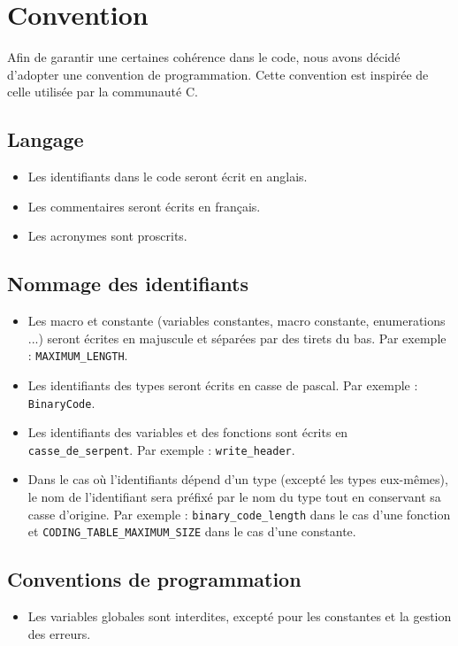 \section{Convention}

Afin de garantir une certaines cohérence dans le code, nous avons décidé d'adopter une convention de programmation.
Cette convention est inspirée de celle utilisée par la communauté C.

\subsection{Langage}

\begin{itemize}
    \item Les identifiants dans le code seront écrit en anglais.
    \item Les commentaires seront écrits en français.
    \item Les acronymes sont proscrits.
\end{itemize}

\subsection{Nommage des identifiants}

\begin{itemize}
    \item Les macro et constante (variables constantes, macro constante, enumerations ...) seront écrites en majuscule et séparées par des tirets du bas. Par exemple : \texttt{MAXIMUM\_LENGTH}.
    \item Les identifiants des types seront écrits en casse de pascal. Par exemple : \texttt{BinaryCode}.
    \item Les identifiants des variables et des fonctions sont écrits en \texttt{casse\_de\_serpent}. Par exemple : \texttt{write\_header}.
    \item Dans le cas où l'identifiants dépend d'un type (excepté les types eux-mêmes), le nom de l'identifiant sera préfixé par le nom du type tout en conservant sa casse d'origine.
    Par exemple : \texttt{binary\_code\_length} dans le cas d'une fonction et \texttt{CODING\_TABLE\_MAXIMUM\_SIZE} dans le cas d'une constante.
\end{itemize}

\subsection{Conventions de programmation}

\begin{itemize}
    \item Les variables globales sont interdites, excepté pour les constantes et la gestion des erreurs.
\end{itemize}
